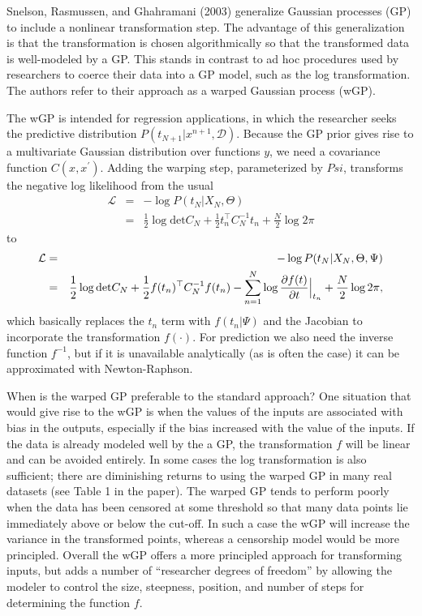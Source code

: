 \documentclass[12pt,letterpaper]{article}
\begin{document}

Snelson, Rasmussen, and Ghahramani (2003) generalize Gaussian processes (GP) to include a nonlinear transformation step. The advantage of this generalization is that the transformation is chosen algorithmically so that the transformed data is well-modeled by a GP. This stands in contrast to ad hoc procedures used by researchers to coerce their data into a GP model, such as the log transformation. The authors refer to their approach as a warped Gaussian process (wGP). 

The wGP is intended for regression applications, in which the researcher seeks the predictive distribution $P(t_{N+1}|x^{n+1}, \mathcal{D})$. Because the GP prior gives rise to a multivariate Gaussian distribution over functions $y$, we need a covariance function $C(x,x^{\prime})$. Adding the warping step, parameterized by $Psi$, transforms the negative log likelihood from the usual
\begin{eqnarray*}
\mathcal{L} &=& -\log P(t_N|X_N, \Theta) \\
&=& \frac{1}{2} \log \text{det} C_N + \frac{1}{2}t_n^{\top}C_N^{-1}t_n + \frac{N}{2}\log 2 \pi
\end{eqnarray*}
to
\begin{eqnarray*}
\mathcal{L} &=& -\log P(t_N | X_N, \Theta, \Psi) \\
&=& \frac{1}{2} \log \text{det} C_N + \frac{1}{2}f(t_n)^{\top}C_N^{-1}f(t_n) - \sum_{n=1}^N \log {\partial f(t) \over \partial t} \Big|_{t_n} + \frac{N}{2}\log 2 \pi,
\end{eqnarray*}
which basically replaces the $t_n$ term with $f(t_n|\Psi)$ and the Jacobian to incorporate the transformation $f(\cdot)$. For prediction we also need the inverse function $f^{-1}$, but if it is unavailable analytically (as is often the case) it can be approximated with Newton-Raphson.

When is the warped GP preferable to the standard approach? One situation that would give rise to the wGP is when the values of the inputs are associated with bias in the outputs, especially if the bias increased with the value of the inputs. If the data is already modeled well by the a GP, the transformation $f$ will be linear and can be avoided entirely. In some cases the log transformation is also sufficient; there are diminishing returns to using the warped GP in many real datasets (see Table 1 in the paper). The warped GP tends to perform poorly when the data has been censored at some threshold so that many data points lie immediately above or below the cut-off. In such a case the wGP will increase the variance in the transformed points, whereas a censorship model would be more principled. Overall the wGP offers a more principled approach for transforming inputs, but adds a number of ``researcher degrees of freedom'' by allowing the modeler to control the size, steepness, position, and number of steps for determining the function $f$. 
\end{document}
